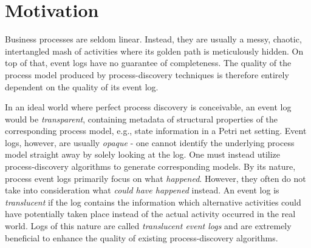 \section{Motivation}
\label{sec:intro_ssec:motiv}



\begin{comment}
    In this section, you explain to the reader why:

\begin{enumerate}
    \item The problem you are solving is relevant to be solved.
    \item The existing solutions do not solve the problem and/or have significant problems/shortcomings when doing so.
\end{enumerate}
Note that parts of this section are already highlighted in both the abstract and the introduction.
However, in this section, you dive a bit deeper.
In a good motivation, you show a (simple) example on which current methods fail, yet, the method that you are going to describe in this thesis actually yields a better result.

For example, assume that your thesis describes a new \emph{process-discovery} algorithm that is able to handle noise, incomplete behavior, and, on top of that, is able to apply label-splitting.
You can take an (example) event log and show that existing algorithms result in models that are of suboptimal quality.
Finally, you show a model discovered by your fancy algorithm, and, you explain why this model is so much better.
\end{comment}

Business processes are seldom linear. Instead, they are usually a messy, chaotic, intertangled mash of activities where its golden path is meticulously hidden. On top of that, event logs have no guarantee of completeness. The quality of the process model produced by process-discovery techniques is therefore entirely dependent on the quality of its event log.

In an ideal world where perfect process discovery is conceivable, an event log would be \emph{transparent}, containing metadata of structural properties of the corresponding process model, e.g., state information in a Petri net setting. Event logs, however, are usually \emph{opaque} - one cannot identify the underlying process model straight away by solely looking at the log. One must instead utilize process-discovery algorithms to generate corresponding models. By its nature, process event logs primarily focus on what \emph{happened}. However, they often do not take into consideration what \emph{could have happened} instead. An event log is \textit{translucent} if the log contains the information which alternative activities could have potentially taken place instead of the actual activity occurred in the real world. Logs of this nature are called \textit{translucent event logs} and are extremely beneficial to enhance the quality of existing process-discovery algorithms.

